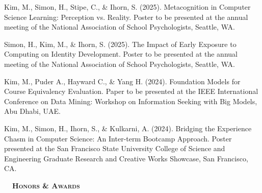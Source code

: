 \documentclass[hidelinks, 10.5pt]{article}
\def\contentwidth{0.9\linewidth}    %
\def\contentblockspacing{2.5mm}     %
\def\sectionspacing{8mm}            %
\def\sectiontocontentspacing{4mm}   %
\renewcommand{\section}[1]{
    {\fontsize{14}{14}\selectfont \textsc{\textbf{\ \ #1\ \ }}}\hrulefill
}
\begin{document}
{\begin{minipage}[ct]{\contentwidth}
    Kim, M., Simon, H., Stipe, C., \& Ihorn, S. (2025). Metacognition in Computer Science Learning: Perception vs. Reality. Poster to be presented at the annual meeting of the National Association of School Psychologists, Seattle, WA.
\end{minipage}

\vspace{\contentblockspacing}

\begin{minipage}[ct]{\contentwidth}
    Simon, H., Kim, M., \& Ihorn, S. (2025). The Impact of Early Exposure to Computing on Identity Development. Poster to be presented at the annual meeting of the National Association of School Psychologists, Seattle, WA.
\end{minipage}

\vspace{\contentblockspacing}

\begin{minipage}[ct]{\contentwidth}
    Kim, M., Puder A., Hayward C., \& Yang H. (2024). Foundation Models for Course Equivalency Evaluation. Paper to be presented at the IEEE International Conference on Data Mining: Workshop on Information Seeking with Big Models, Abu Dhabi, UAE.
\end{minipage}

\vspace{\contentblockspacing}

\begin{minipage}[ct]{\contentwidth}
    Kim, M., Simon, H., Ihorn, S., \& Kulkarni, A. (2024). Bridging the Experience Chasm in Computer Science: An Inter-term Bootcamp Approach. Poster presented at the San Francisco State University College of Science and Engineering Graduate Research and Creative Works Showcase, San Francisco, CA.
\end{minipage}

\vspace{\sectionspacing}


\section{Honors \& Awards}

\vspace{\sectiontocontentspacing}

}
\end{document}
